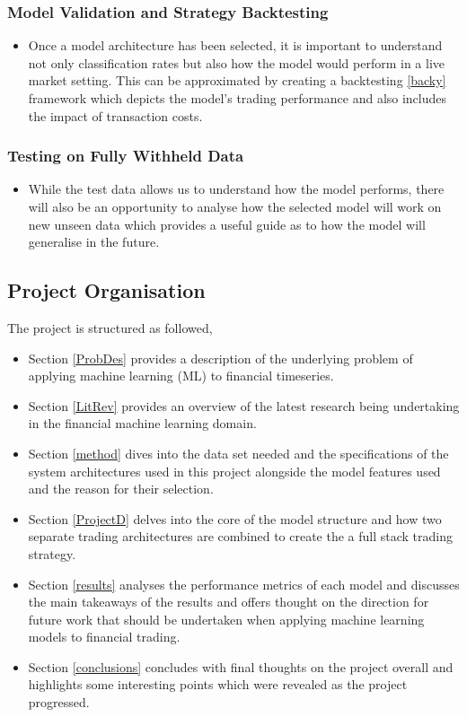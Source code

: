 \documentclass[11pt]{article}
\begin{document}
 \subsubsection{Model Validation and Strategy Backtesting}
	\begin{itemize}
	\item Once a model architecture has been selected, it is important to understand not only classification rates but also how the model would perform in a live market setting. This can be approximated by creating a backtesting \ref{backy} framework which depicts the model's trading performance and also includes the impact of transaction costs.
	\end{itemize}
\subsubsection{Testing on Fully Withheld Data}
	\begin{itemize}
	\item While the test data allows us to understand how the model performs, there will also be an opportunity to analyse how the selected model will work on new unseen data which provides a useful guide as to how the model will generalise in the future.
	\end{itemize}

\subsection{Project Organisation}
The project is structured as followed, 
\begin{itemize}
\item Section \ref{ProbDes} provides a description of the underlying problem of applying machine learning (ML) to financial timeseries.
\item Section \ref{LitRev} provides an overview of the latest research being undertaking in the financial machine learning domain.
\item Section \ref{method} dives into the data set needed and the specifications of the system architectures used in this project alongside the model features used and the reason for their selection.
\item Section \ref{ProjectD} delves into the core of the model structure and how two separate trading architectures are combined to create the a full stack trading strategy.
\item Section \ref{results} analyses the performance metrics of each model  and discusses the main takeaways of the results and offers thought on the direction for future work that should be undertaken when applying machine learning models to financial trading.
\item Section \ref{conclusions} concludes with final thoughts on the project overall and highlights some interesting points which were revealed as the project progressed. 
\end{itemize}
\end{document}
